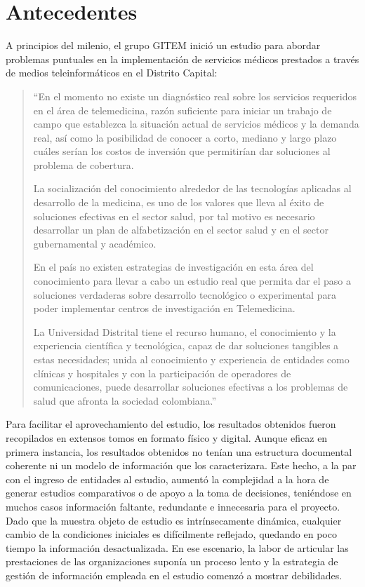 \chapter{Antecedentes}

A principios del milenio, el grupo GITEM inició un estudio para abordar problemas puntuales en la implementación de servicios médicos prestados a través de medios teleinformáticos en el Distrito Capital\cite{aparicio2000}:

\begin{quote}
“En el momento no existe un diagnóstico real sobre los servicios requeridos en el área de telemedicina, razón suficiente para iniciar un trabajo de campo que establezca la situación actual de servicios médicos y la demanda real, así como la posibilidad de conocer a corto, mediano y largo plazo cuáles serían los costos de inversión que permitirían dar soluciones al problema  de cobertura.

La socialización del conocimiento alrededor de las tecnologías aplicadas al desarrollo de la medicina, es uno de los valores que lleva al éxito de soluciones efectivas en el sector salud, por tal motivo es necesario desarrollar un plan de alfabetización en el sector salud y en el sector gubernamental y académico.

En el país no existen estrategias de investigación en esta área del conocimiento para llevar a cabo un estudio real que permita dar el paso a soluciones verdaderas sobre desarrollo tecnológico o experimental para poder implementar centros de investigación en Telemedicina.

La Universidad Distrital tiene el recurso humano, el conocimiento y la experiencia científica y tecnológica, capaz de dar soluciones tangibles a estas necesidades; unida al conocimiento y experiencia de entidades como clínicas y hospitales  y con la participación de operadores de comunicaciones, puede desarrollar soluciones efectivas a los problemas de salud que afronta la sociedad colombiana.”
\end{quote}

Para facilitar el aprovechamiento del estudio, los resultados obtenidos fueron recopilados en extensos tomos en formato físico y digital. Aunque eficaz en primera instancia, los resultados obtenidos no tenían una estructura documental coherente ni un modelo de información que los caracterizara. Este hecho, a la par con el ingreso de entidades al estudio, aumentó la complejidad a la hora de generar estudios comparativos o de apoyo a la toma de decisiones, teniéndose en muchos casos información faltante, redundante e innecesaria para el proyecto. Dado que la muestra objeto de estudio es intrínsecamente dinámica, cualquier cambio de la condiciones iniciales es difícilmente reflejado, quedando en poco tiempo la información desactualizada. En ese escenario, la labor de articular las prestaciones de las organizaciones suponía un proceso lento y la estrategia de gestión de información empleada en el estudio comenzó a mostrar debilidades.

